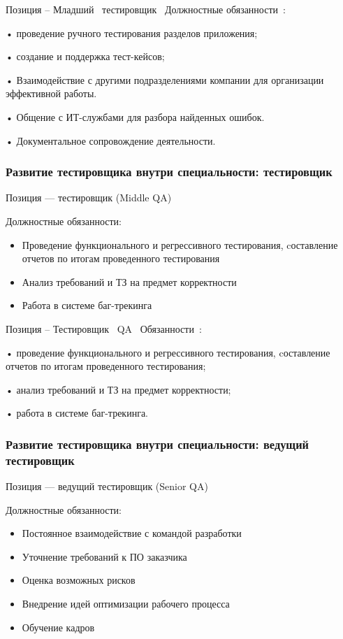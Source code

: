 \documentclass{../industrial-development}
\begin{document}
\lecturenotes

Позиция – Младший~\cite{hh} тестировщик~\cite{itcf}
Должностные обязанности~\cite{rab}: 

•	проведение ручного тестирования разделов приложения;

•	создание и поддержка тест-кейсов;

•	Взаимодействие с другими подразделениями компании для организации эффективной работы.

•	Общение с ИТ-службами для разбора найденных ошибок.

•	Документальное сопровождение деятельности.

\begin{frame} \frametitle{Развитие тестировщика внутри специальности: тестировщик}
 \begin{block}{}
  \alert{Позиция --- тестировщик (Middle QA)}

Должностные обязанности: 
  \end{block}
  \begin{itemize}
  \item Проведение функционального и регрессивного тестирования, cоставление отчетов по итогам проведенного тестирования
  \item Анализ требований и ТЗ на предмет корректности
  \item Работа в системе баг-трекинга
  \end{itemize}
\end{frame}

\lecturenotes

Позиция – Тестировщик~\cite{hh} QA~\cite{itcf}
Обязанности~\cite{rab}:

•	проведение функционального и регрессивного тестирования, cоставление отчетов по итогам проведенного тестирования;

•	анализ требований и ТЗ на предмет корректности;

•	работа в системе баг-трекинга.

\begin{frame} \frametitle{Развитие тестировщика внутри специальности: ведущий тестировщик}
 \begin{block}{}
  \alert{Позиция --- ведущий тестировщик (Senior QA)}

Должностные обязанности: 
  \end{block}
  \begin{itemize}
  \item Постоянное взаимодействие с командой разработки
  \item Уточнение требований к ПО заказчика 
  \item Оценка возможных рисков
 \item Внедрение идей оптимизации рабочего процесса
 \item Обучение кадров
  \end{itemize}
\end{frame}
\end{document}
